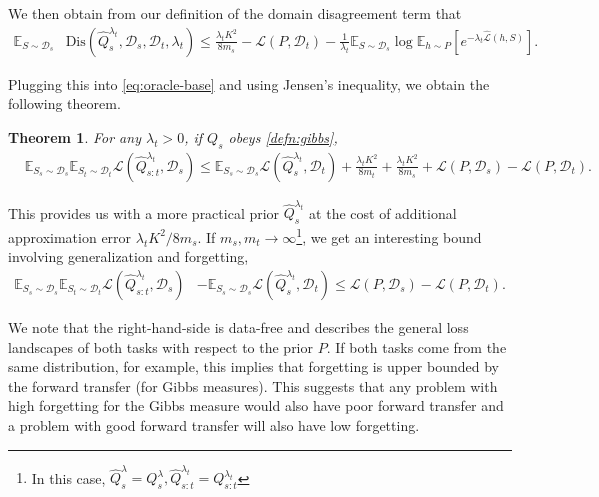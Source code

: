 \documentclass{article}
\theoremstyle{plain}
\newtheorem{theorem}{Theorem}[section]
\theoremstyle{definition}
\theoremstyle{remark}
\begin{document}
We then obtain from our definition of the domain disagreement term that  
\begin{equation*}
\begin{split}
    \mathbb{E}_{S\sim \mathcal{D}_s}&\mathrm{Dis}(\hat{Q}^{\lambda_t}_{s},\mathcal{D}_s, \mathcal{D}_t, \lambda_t )\leq \frac{\lambda_t K^2}{8m_s} -\mathcal{L}(P,\mathcal{D}_t) -\frac{1}{\lambda_t}\mathbb{E}_{S\sim \mathcal{D}_s}\log\mathbb{E}_{h\sim P}\left [e^{-\lambda_t\hat{\mathcal{L}}(h,S)} \right ].
\end{split}
\end{equation*}

Plugging this into \eqref{eq:oracle-base} and using Jensen's inequality, we obtain the following theorem.

\begin{theorem}
For any $\lambda_t>0$, if $Q_s$ obeys \eqref{defn:gibbs}, 
%
\begin{equation*}
\begin{split}
&\mathbb{E}_{S_s\sim \mathcal{D}_s}\mathbb{E}_{S_t\sim \mathcal{D}_t}\mathcal{L}( \hat{Q}^{\lambda_t}_{s:t},\mathcal{D}_s)\leq \mathbb{E}_{S_s\sim \mathcal{D}_s}\mathcal{L}(\hat{Q}^{\lambda_t}_s,\mathcal{D}_t)+\frac{\lambda_t K^2}{8m_t}+\frac{\lambda_t K^2}{8m_s}+\mathcal{L}(P,\mathcal{D}_s)-\mathcal{L}(P,\mathcal{D}_t).
\end{split}
\end{equation*}
\end{theorem}

This provides us with a more practical prior $\hat{Q}^{\lambda_t}_s$ at the cost of additional approximation error $\lambda_t K^2/8m_s$.
If $m_s,m_t\rightarrow \infty$\footnote{In this case, $\hat{Q}^\lambda_s=Q^\lambda_s, \hat{Q}^{\lambda_t}_{s:t}=Q^{\lambda_t}_{s:t}$}, we get an interesting bound involving generalization and forgetting,
%
\begin{equation*}
\begin{split}
\mathbb{E}_{S_s\sim \mathcal{D}_s}\mathbb{E}_{S_t\sim \mathcal{D}_t}\mathcal{L}( \hat{Q}^{\lambda_t}_{s:t},\mathcal{D}_s)&-\mathbb{E}_{S_s\sim \mathcal{D}_s}\mathcal{L}(\hat{Q}^{\lambda_t}_s,\mathcal{D}_t)\leq \mathcal{L}(P,\mathcal{D}_s)-\mathcal{L}(P,\mathcal{D}_t).
\end{split}
\end{equation*}

We note that the right-hand-side is data-free and describes the general loss landscapes of both tasks with respect to the prior $P$. If both tasks come from the same distribution, for example, this implies that forgetting is upper bounded by the forward transfer (for Gibbs measures).
This suggests that any problem with high forgetting for the Gibbs measure would also have poor forward transfer and a problem with good forward transfer will also have low forgetting. 
\end{document}
